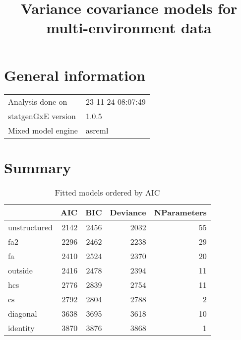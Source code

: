 \documentclass[a4paper,11pt]{article}\usepackage[]{graphicx}\usepackage[]{xcolor}
\title{Variance covariance models for multi-environment data}%
\author{\vspace{-5ex}}
\date{\vspace{-5ex}}
\begin{document}
\maketitle
\singlespacing

\section{General information}
\begin{table}[ht]
\begin{flushleft}
\begin{tabular}{ll}
  Analysis done on & 23-11-24 08:07:49 \\ 
  statgenGxE version & 1.0.5 \\ 
  Mixed model engine & asreml \\ 
  \end{tabular}
\label{general}
\end{flushleft}
\end{table}


\section{Summary}
\begin{table}[ht]
\begin{flushleft}
\caption{Fitted models ordered by AIC} 
\label{summary}
\begin{tabular}{lrrrr}
  \hline
 & AIC & BIC & Deviance & NParameters \\ 
  \hline
unstructured & 2142 & 2456 & 2032 & 55 \\ 
  fa2 & 2296 & 2462 & 2238 & 29 \\ 
  fa & 2410 & 2524 & 2370 & 20 \\ 
  outside & 2416 & 2478 & 2394 & 11 \\ 
  hcs & 2776 & 2839 & 2754 & 11 \\ 
  cs & 2792 & 2804 & 2788 & 2 \\ 
  diagonal & 3638 & 3695 & 3618 & 10 \\ 
  identity & 3870 & 3876 & 3868 & 1 \\ 
   \hline
\end{tabular}
\end{flushleft}
\end{table}
\end{document}
